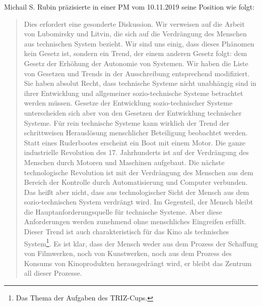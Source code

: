\documentclass[11pt,a4paper]{article}
\begin{document}
Michail S. Rubin präzisierte in einer PM vom 10.11.2019 seine Position wie
folgt:
\begin{quote}
  Dies erfordert eine gesonderte Diskussion. Wir verweisen auf die Arbeit von
  Lubomirsky und Litvin, die sich auf die Verdrängung des Menschen aus
  technischen System bezieht.  Wir sind uns einig, dass dieses Phänomen kein
  Gesetz ist, sondern ein Trend, der einem anderen Gesetz folgt: dem Gesetz
  der Erhöhung der Autonomie von Systemen.  Wir haben die Liste von Gesetzen
  und Trends in der Ausschreibung entsprechend modifiziert. Sie haben absolut
  Recht, dass technische Systeme nicht unabhängig sind in ihrer Entwicklung
  und allgemeiner sozio-technische Systeme betrachtet werden müssen. Gesetze
  der Entwicklung sozio-technischer Systeme unterscheiden sich aber von den
  Gesetzen der Entwicklung technischer Systeme. Für rein technische Systeme
  kann wirklich der Trend der schrittweisen Herauslösung menschlicher
  Beteiligung beobachtet werden. Statt eines Ruderbootes erscheint ein Boot
  mit einem Motor. Die ganze industrielle Revolution des 17. Jahrhunderts ist
  auf der Verdrängung des Menschen durch Motoren und Maschinen aufgebaut. Die
  nächste technologische Revolution ist mit der Verdrängung des Menschen aus
  dem Bereich der Kontrolle durch Automatisierung und Computer verbunden. Das
  heißt aber nicht, dass aus technologischer Sicht der Mensch aus dem
  sozio-technischen System verdrängt wird. Im Gegenteil, der Mensch bleibt die
  Hauptanforderungsquelle für technische Systeme. Aber diese Anforderungen
  werden zunehmend ohne menschliches Eingreifen erfüllt. Dieser Trend ist auch
  charakteristisch für das Kino als technisches System\footnote{Das Thema der
    Aufgaben des TRIZ-Cups.}. Es ist klar, dass der Mensch weder aus dem
  Prozess der Schaffung von Filmwerken, noch von Kunstwerken, noch aus dem
  Prozess des Konsums von Kinoprodukten herausgedrängt wird, er bleibt das
  Zentrum all dieser Prozesse.
\end{quote}
\end{document}
